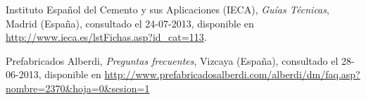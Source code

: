 \begin{thebibliography}{100}







Instituto Español del Cemento y sus Aplicaciones (IECA), \emph{Guías Técnicas}, Madrid (España), consultado el 24-07-2013, disponible en \url{http://www.ieca.es/lstFichas.asp?id_cat=113}.

Prefabricados Alberdi, \emph{Preguntas frecuentes}, Vizcaya (España), consultado el 28-06-2013, disponible en \url{http://www.prefabricadosalberdi.com/alberdi/dm/faq.asp?nombre=2370&hoja=0&sesion=1}
\end{thebibliography}
